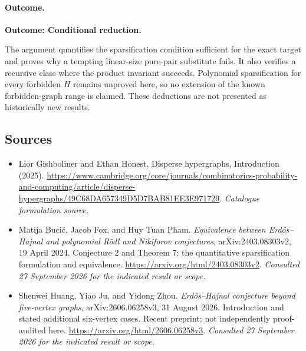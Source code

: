 \documentclass[11pt,a4paper]{article}
\numberwithin{equation}{section}
\begin{document}
\paragraph{Outcome.}
\textbf{Outcome: Conditional reduction.}

The argument quantifies the sparsification condition sufficient for
the exact target and proves why a tempting linear-size pure-pair
substitute fails.  It also verifies a recursive class where the product
invariant succeeds.  Polynomial sparsification for every forbidden
$H$ remains unproved here, so no extension of the known forbidden-graph
range is claimed.  These deductions are not presented as historically
new results.
\subsection{Sources}
\begin{itemize}\raggedright
\item[\textnormal{[S1]}]\hypertarget{source:statement:1}{} Lior Gishboliner and Ethan Honest, Disperse hypergraphs, Introduction (2025).
\url{https://www.cambridge.org/core/journals/combinatorics-probability-and-computing/article/disperse-hypergraphs/49C68DA657349D5D7BAB81EE3E971729}.
{\small\textit{Catalogue formulation source.}}
\item[\textnormal{[E1]}]\hypertarget{extra:statement:1}{} Matija Buci\'c, Jacob Fox, and Huy Tuan Pham.
\emph{Equivalence between Erd\H{o}s--Hajnal and polynomial R\"odl and Nikiforov conjectures}, arXiv:2403.08303v2, 19 April 2024. Conjecture 2 and Theorem 7; the quantitative sparsification formulation and equivalence.
\url{https://arxiv.org/html/2403.08303v2}.
{\small\textit{Consulted 27 September 2026 for the indicated result or scope.}}
\item[\textnormal{[E2]}]\hypertarget{extra:statement:2}{} Shenwei Huang, Yiao Ju, and Yidong Zhou.
\emph{Erd\H{o}s--Hajnal conjecture beyond five-vertex graphs}, arXiv:2606.06258v3, 31 August 2026. Introduction and stated additional six-vertex cases. Recent preprint; not independently proof-audited here.
\url{https://arxiv.org/html/2606.06258v3}.
{\small\textit{Consulted 27 September 2026 for the indicated result or scope.}}
\end{itemize}
\end{document}
